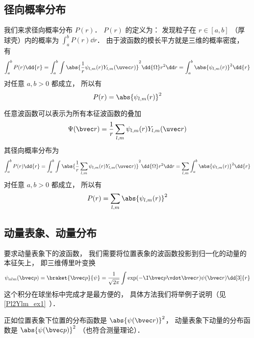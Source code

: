 \subsection{径向概率分布}
我们来求径向概率分布 $P(r)$． $P(r)$ 的定义为： 发现粒子在 $r \in [a, b]$ （厚球壳）内的概率为 $\int_a^b P(r) \dd{r}$． 由于波函数的模长平方就是三维的概率密度， 有
\begin{equation}
\int_a^b P(r) \dd{r} = \int_a^b \int \abs{\frac1r \psi_{l,m}(r) Y_{l,m}(\uvec r)}^2 \dd{\Omega} r^2 \dd r
= \int_a^b \abs{\psi_{l,m}(r)}^2 \dd{r}
\end{equation}
对任意 $a, b > 0$ 都成立， 所以有
\begin{equation}
P(r) = \abs{\psi_{l,m}(r)}^2
\end{equation}

任意波函数可以表示为所有本征波函数的叠加
\begin{equation}
\Psi(\bvec r) = \frac1r \sum_{l,m} \psi_{l,m}(r) Y_{l,m}(\uvec r)
\end{equation}
其径向概率分布为
\begin{equation}\label{HWF_eq4}
\int_a^b P(r) \dd{r} = \int_a^b \int \abs{\frac1r \sum_{l,m}\psi_{l,m}(r) Y_{l,m}(\uvec r)}^2 \dd{\Omega} r^2 \dd r
= \sum_{l,m} \int_a^b \abs{\psi_{l,m}(r)}^2 \dd{r}
\end{equation}
对任意 $a, b > 0$ 都成立， 所以有
\begin{equation}
P(r) = \sum_{l,m} \abs{\psi_{l,m}(r)}^2
\end{equation}

\subsection{动量表象、动量分布}
要求动量表象下的波函数， 我们需要将位置表象的波函数投影到归一化的动量的本征矢上， 即三维傅里叶变换
\begin{equation}
\psi_{nlm}(\bvec p) = \braket{\bvec p}{\psi} = \frac{1}{\sqrt{2\pi}} \int \exp(-\I \bvec p \vdot \bvec r) \psi(\bvec r) \dd[3]{r}
\end{equation}
这个积分在球坐标中完成才是最方便的， 具体方法我们将举例子说明（见\autoref{Pl2Ylm_ex1}~）．

正如位置表象下位置的分布函数是 $\abs{\psi(\bvec r)}^2$， 动量表象下动量的分布函数是 $\abs{\psi(\bvec p)}^2$ （也符合测量理论）．
